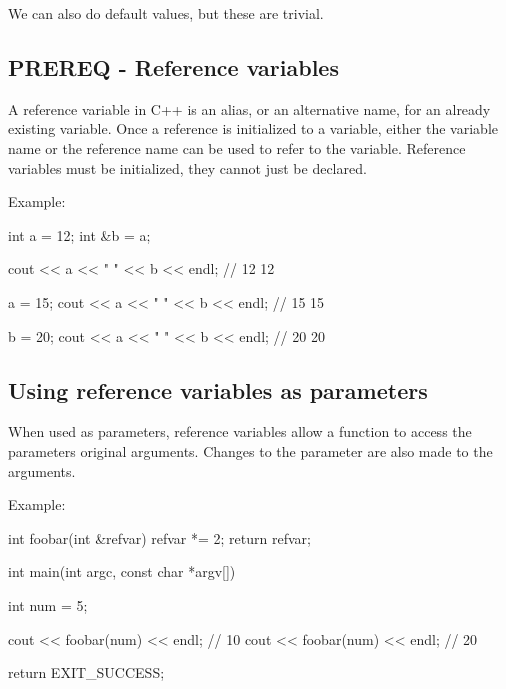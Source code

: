 \documentclass{report}
\begin{document}
    \bigbreak \noindent 
    We can also do default values, but these are trivial.

    \bigbreak \noindent 
    \subsection{PREREQ - Reference variables}
    \bigbreak \noindent 
    \begin{concept}
 A reference variable in C++ is an alias, or an alternative name, for an already existing variable. Once a reference is initialized to a variable, either the variable name or the reference name can be used to refer to the variable. Reference variables must be initialized, they cannot just be declared.
	\end{concept}
    \bigbreak \noindent 
    Example:
    \bigbreak \noindent 
    
    \begin{cppcode}
int a = 12;
int &b = a; 

cout << a << " " << b << endl; // 12 12

a = 15;
cout << a << " " << b << endl; // 15 15

b = 20; 
cout << a << " " << b << endl; // 20 20

    \end{cppcode}
    

    \pagebreak \bigbreak \noindent 
    \subsection{Using reference variables as parameters}
    \bigbreak \noindent 
    \begin{concept}
 When used as parameters, reference variables allow a function to access the parameters original arguments. Changes to the parameter are also made to the arguments.
	\end{concept}
    \bigbreak \noindent 
    Example:
    \bigbreak \noindent 
    
    \begin{cppcode}
int foobar(int &refvar) { refvar *= 2; return refvar; }

int main(int argc, const char *argv[]) {
    
    int num = 5;

    cout << foobar(num) << endl;  // 10
    cout << foobar(num) << endl;  // 20

    return EXIT_SUCCESS;
}
    \end{cppcode}
    
\end{document}
